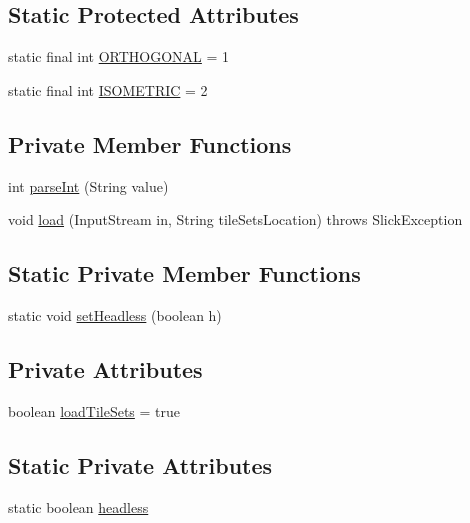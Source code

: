 \subsection*{Static Protected Attributes}
\begin{DoxyCompactItemize}
\item 
static final int \mbox{\hyperlink{classorg_1_1newdawn_1_1slick_1_1tiled_1_1_tiled_map_aee2ab711fd19bcd0a1977fe0895607bb}{O\+R\+T\+H\+O\+G\+O\+N\+AL}} = 1
\item 
static final int \mbox{\hyperlink{classorg_1_1newdawn_1_1slick_1_1tiled_1_1_tiled_map_abe8c8af0eeec35e4533db6fab4d53cba}{I\+S\+O\+M\+E\+T\+R\+IC}} = 2
\end{DoxyCompactItemize}
\subsection*{Private Member Functions}
\begin{DoxyCompactItemize}
\item 
int \mbox{\hyperlink{classorg_1_1newdawn_1_1slick_1_1tiled_1_1_tiled_map_a8958f06ac942b890600b3c7f92bfb9be}{parse\+Int}} (String value)
\item 
void \mbox{\hyperlink{classorg_1_1newdawn_1_1slick_1_1tiled_1_1_tiled_map_af1c08899abc9e8c33cb08704b764e498}{load}} (Input\+Stream in, String tile\+Sets\+Location)  throws Slick\+Exception 
\end{DoxyCompactItemize}
\subsection*{Static Private Member Functions}
\begin{DoxyCompactItemize}
\item 
static void \mbox{\hyperlink{classorg_1_1newdawn_1_1slick_1_1tiled_1_1_tiled_map_a195198868d47b2d95af1ec6e99591885}{set\+Headless}} (boolean h)
\end{DoxyCompactItemize}
\subsection*{Private Attributes}
\begin{DoxyCompactItemize}
\item 
boolean \mbox{\hyperlink{classorg_1_1newdawn_1_1slick_1_1tiled_1_1_tiled_map_a49356f102a76e7845f6dfbd4c6b70b59}{load\+Tile\+Sets}} = true
\end{DoxyCompactItemize}
\subsection*{Static Private Attributes}
\begin{DoxyCompactItemize}
\item 
static boolean \mbox{\hyperlink{classorg_1_1newdawn_1_1slick_1_1tiled_1_1_tiled_map_aebbb5f7e7df93bc341d03b8bb55a2481}{headless}}
\end{DoxyCompactItemize}


